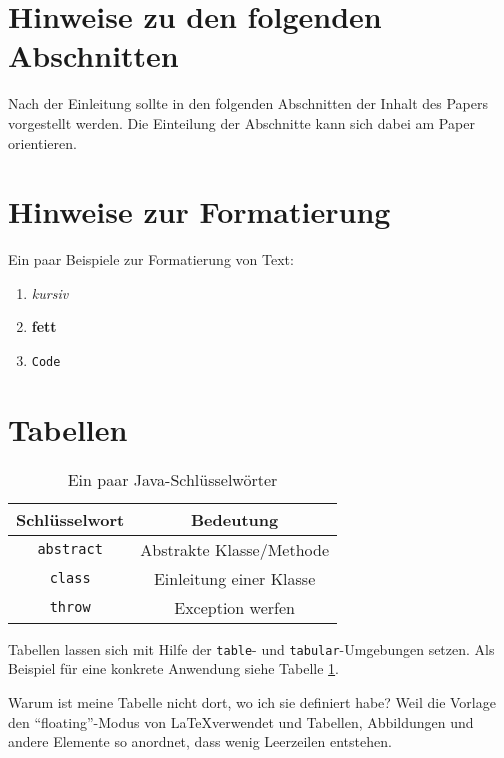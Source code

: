 \documentclass[ngerman]{ewks-latex}
\begin{document}
\pagebreak



\section{Hinweise zu den folgenden Abschnitten}
Nach der Einleitung sollte in den folgenden Abschnitten der Inhalt des Papers vorgestellt werden. Die Einteilung der Abschnitte kann sich dabei am Paper orientieren.

\section{Hinweise zur Formatierung}
Ein paar Beispiele zur Formatierung von Text:
\begin{enumerate}
\item \textit{kursiv}
\item \textbf{fett}
\item \texttt{Code}
\end{enumerate}

\section{Tabellen}
\begin{table} %
\centering %
\caption{Ein paar Java-Schlüsselwörter} %
\label{tab:example} %
\begin{tabular}{|c|c|} \hline %
Schlüsselwort & Bedeutung \\ \hline %
\texttt{abstract} & Abstrakte Klasse/Methode \\ \hline %
\texttt{class} & Einleitung einer Klasse \\ \hline %
\texttt{throw} & Exception werfen \\ \hline %
\end{tabular}
\end{table}

Tabellen lassen sich mit Hilfe der \texttt{table}- und \texttt{tabular}-Umgebungen setzen. Als Beispiel für eine konkrete Anwendung siehe Tabelle \ref{tab:example}.

Warum ist meine Tabelle nicht dort, wo ich sie definiert habe? Weil die Vorlage den "`floating"'-Modus von \LaTeX verwendet und Tabellen, Abbildungen und andere Elemente so anordnet, dass wenig Leerzeilen entstehen.
\end{document}
